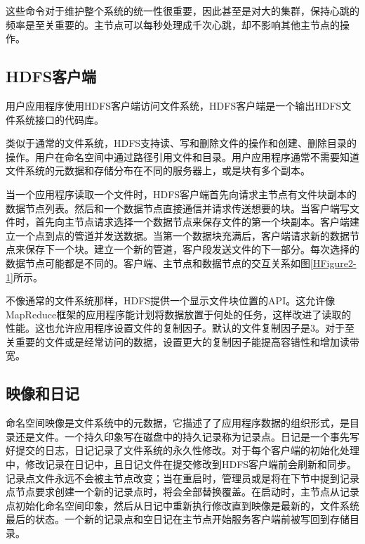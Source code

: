 这些命令对于维护整个系统的统一性很重要，因此甚至是对大的集群，保持心跳的频率是至关重要的。主节点可以每秒处理成千次心跳，却不影响其他主节点的操作。

\subsection{HDFS客户端}

用户应用程序使用HDFS客户端访问文件系统，HDFS客户端是一个输出HDFS文件系统接口的代码库。

类似于通常的文件系统，HDFS支持读、写和删除文件的操作和创建、删除目录的操作。用户在命名空间中通过路径引用文件和目录。用户应用程序通常不需要知道文件系统的元数据和存储分布在不同的服务器上，或是块有多个副本。

当一个应用程序读取一个文件时，HDFS客户端首先向请求主节点有文件块副本的数据节点列表。然后和一个数据节点直接通信并请求传送想要的块。当客户端写文件时，首先向主节点请求选择一个数据节点来保存文件的第一个块副本。客户端建立一个点到点的管道并发送数据。当第一个数据块充满后，客户端请求新的数据节点来保存下一个块。建立一个新的管道，客户段发送文件的下一部分。每次选择的数据节点可能都是不同的。客户端、主节点和数据节点的交互关系如图\ref{HFigure2-1}所示。


不像通常的文件系统那样，HDFS提供一个显示文件块位置的API。这允许像MapReduce框架的应用程序能计划将数据放置于何处的任务，这样改进了读取的性能。这也允许应用程序设置文件的复制因子。默认的文件复制因子是3。对于至关重要的文件或是经常访问的数据，设置更大的复制因子能提高容错性和增加读带宽。

\subsection{映像和日记}

命名空间映像是文件系统中的元数据，它描述了了应用程序数据的组织形式，是目录还是文件。一个持久印象写在磁盘中的持久记录称为记录点。日记是一个事先写好提交的日志，日记记录了文件系统的永久性修改。对于每个客户端的初始化处理中，修改记录在日记中，且日记文件在提交修改到HDFS客户端前会刷新和同步。记录点文件永远不会被主节点改变；当在重启时，管理员或是将在下节中提到记录点节点要求创建一个新的记录点时，将会全部替换覆盖。在启动时，主节点从记录点初始化命名空间印象，然后从日记中重新执行修改直到映像是最新的，文件系统最后的状态。一个新的记录点和空日记在主节点开始服务客户端前被写回到存储目录。

